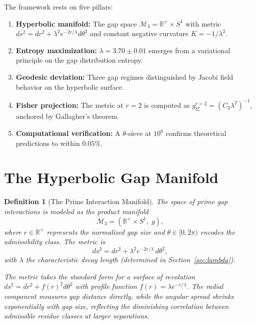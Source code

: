 \documentclass[12pt]{article}
\newtheorem{definition}[theorem]{Definition}
\begin{document}
The framework rests on five pillars:

\begin{enumerate}
  \item \textbf{Hyperbolic manifold:} The gap space $\mathcal{M}_3 = \mathbb{R}^+ \times S^1$
    with metric $ds^2 = dr^2 + \lambda^2 e^{-2r/\lambda} d\theta^2$ and constant
    negative curvature $K = -1/\lambda^2$.
  \item \textbf{Entropy maximization:} $\lambda = 3.70 \pm 0.01$ emerges from a
    variational principle on the gap distribution entropy.
  \item \textbf{Geodesic deviation:} Three gap regimes distinguished by Jacobi
    field behavior on the hyperbolic surface.
  \item \textbf{Fisher projection:} The metric at $r=2$ is computed as
    $g_{\xi\xi}^{r=2} = (C_2 \lambda^2)^{-1}$, anchored by Gallagher's theorem.
  \item \textbf{Computational verification:} A $\theta$-sieve at $10^8$ confirms
    theoretical predictions to within $0.05\%$.
\end{enumerate}

\section{The Hyperbolic Gap Manifold}

\begin{definition}[The Prime Interaction Manifold]
The space of prime gap interactions is modeled as the product manifold
\[
  \mathcal{M}_3 = \left(\mathbb{R}^+ \times S^1,\; g\right),
\]
where $r \in \mathbb{R}^+$ represents the normalized gap size and
$\theta \in [0, 2\pi)$ encodes the admissibility class. The metric is
\begin{equation}
  ds^2 = dr^2 + \lambda^2 e^{-2r/\lambda}\, d\theta^2,
  \label{eq:metric}
\end{equation}
with $\lambda$ the characteristic decay length (determined in
Section~\ref{sec:lambda}).

The metric takes the standard form for a surface of revolution $ds^2 = dr^2 + f(r)^2 d\theta^2$
with profile function $f(r) = \lambda e^{-r/\lambda}$. The radial component measures
gap distance directly, while the angular spread shrinks exponentially with gap size,
reflecting the diminishing correlation between admissible residue classes at larger
separations.
\end{definition}
\end{document}
